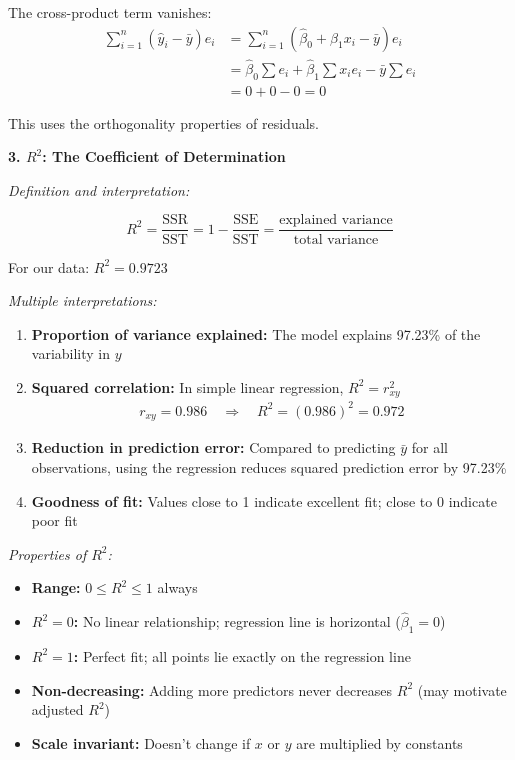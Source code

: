 \documentclass[12pt]{article}
\begin{document}
\begin{explanation}
The cross-product term vanishes:
\begin{align*}
\sum_{i=1}^{n}(\hat{y}_i - \bar{y})e_i &= \sum_{i=1}^{n}(\hat{\beta}_0 + \hat{\beta}_1 x_i - \bar{y})e_i \\
&= \hat{\beta}_0\sum e_i + \hat{\beta}_1\sum x_i e_i - \bar{y}\sum e_i \\
&= 0 + 0 - 0 = 0
\end{align*}

This uses the orthogonality properties of residuals.

\textbf{3. $R^2$: The Coefficient of Determination}

\textit{Definition and interpretation:}

\[
R^2 = \frac{\text{SSR}}{\text{SST}} = 1 - \frac{\text{SSE}}{\text{SST}} = \frac{\text{explained variance}}{\text{total variance}}
\]

For our data: $R^2 = 0.9723$

\textit{Multiple interpretations:}

\begin{enumerate}
    \item \textbf{Proportion of variance explained:} The model explains 97.23\% of the variability in $y$

    \item \textbf{Squared correlation:} In simple linear regression, $R^2 = r_{xy}^2$
    \begin{align*}
    r_{xy} = 0.986 \quad \Rightarrow \quad R^2 = (0.986)^2 = 0.972
    \end{align*}

    \item \textbf{Reduction in prediction error:} Compared to predicting $\bar{y}$ for all observations, using the regression reduces squared prediction error by 97.23\%

    \item \textbf{Goodness of fit:} Values close to 1 indicate excellent fit; close to 0 indicate poor fit
\end{enumerate}

\textit{Properties of $R^2$:}

\begin{itemize}
    \item \textbf{Range:} $0 \leq R^2 \leq 1$ always
    \item \textbf{$R^2 = 0$:} No linear relationship; regression line is horizontal ($\hat{\beta}_1 = 0$)
    \item \textbf{$R^2 = 1$:} Perfect fit; all points lie exactly on the regression line
    \item \textbf{Non-decreasing:} Adding more predictors never decreases $R^2$ (may motivate adjusted $R^2$)
    \item \textbf{Scale invariant:} Doesn't change if $x$ or $y$ are multiplied by constants
\end{itemize}


\end{explanation}
\end{document}
